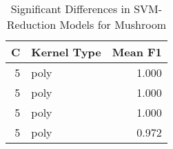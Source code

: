 \begin{table}
\centering
\caption{Significant Differences in SVM-Reduction Models for Mushroom}
\label{tab:svm_reduction_significant_pairs_mushroom}
\begin{tabular}{rlr}
\toprule
C & Kernel Type & Mean F1 \\
\midrule
5 & poly & 1.000 \\
5 & poly & 1.000 \\
5 & poly & 1.000 \\
5 & poly & 0.972 \\
\bottomrule
\end{tabular}
\end{table}
